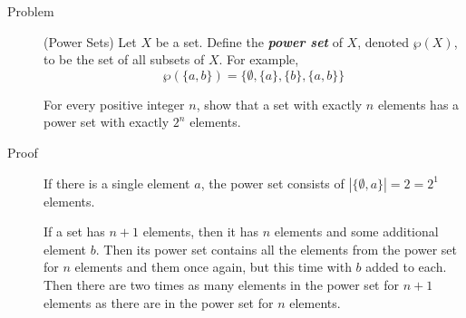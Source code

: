 \begin{description}
\item[Problem] (Power Sets) Let $X$ be a set. Define the \textit{\textbf{power
set}} of $X$, denoted $\wp (X)$, to be the set of all subsets of $X$. For
example,
$$\wp\left(\{a, b\}\right) = \{\emptyset, \{a\}, \{b\}, \{a, b\}\}$$

For every positive integer $n$, show that a set with exactly $n$ elements has
a power set with exactly $2^n$ elements.

\item[Proof] If there is a single element $a$, the power set consists of $|\{
\emptyset, a\}| = 2 = 2^1$ elements.

If a set has $n + 1$ elements, then it has $n$ elements and some additional
element $b$. Then its power set contains all the elements from the power set
for $n$ elements and them once again, but this time with $b$ added to each.
Then there are two times as many elements in the power set for $n + 1$ elements
as there are in the power set for $n$ elements.

\end{description}
